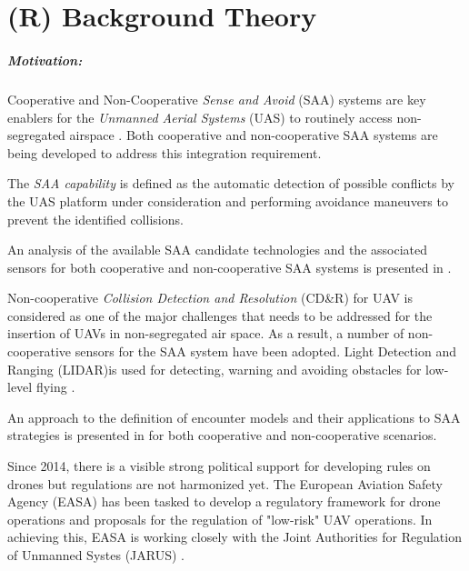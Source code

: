 \cleardoublepage
\chapter{(R) Background Theory}\label{ch:backGroundTheory}

\paragraph{Motivation:} Cooperative and Non-Cooperative \emph{Sense and Avoid} (SAA) systems are key enablers for the \emph{Unmanned Aerial Systems} (UAS) to routinely access non-segregated airspace \cite{spriesterbach2013unmanned}. Both cooperative and non-cooperative SAA systems are being developed to address this integration requirement.

The \emph{SAA capability} is defined as the automatic detection of possible conflicts by the UAS platform under consideration and performing avoidance maneuvers to prevent the identified collisions.

An analysis of the available SAA candidate technologies and the associated sensors for both cooperative and non-cooperative SAA systems is presented in \cite{muraru2011critical}. 

Non-cooperative \emph{Collision Detection and Resolution} (CD\&R) for UAV is considered as one of the major challenges that needs to be addressed \cite{lai2012see} for the insertion of UAVs in non-segregated air space. As a result, a number of non-cooperative sensors for the SAA system have been adopted. Light Detection and Ranging (LIDAR)is used for detecting, warning and avoiding obstacles for low-level flying \cite{sabatini2014lidar}.

An approach to the definition of encounter models and their applications to SAA strategies is presented in \cite{kochenderfer2008encounter} for both cooperative and non-cooperative scenarios.

Since 2014, there is a visible strong political support for developing rules on drones but regulations are not harmonized yet. The European Aviation Safety Agency (EASA) has been tasked to develop a regulatory framework for drone operations and proposals for the regulation of "low-risk" UAV operations. In achieving this, EASA is working closely with the Joint Authorities for Regulation of Unmanned Systes (JARUS) \cite{jarus2016regulations}.

